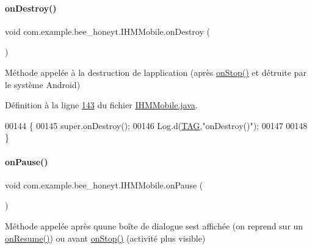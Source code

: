 \paragraph{\texorpdfstring{on\+Destroy()}{onDestroy()}}
{\footnotesize\ttfamily void com.\+example.\+bee\+\_\+honeyt.\+I\+H\+M\+Mobile.\+on\+Destroy (\begin{DoxyParamCaption}{ }\end{DoxyParamCaption})\hspace{0.3cm}{\ttfamily [protected]}}



Méthode appelée à la destruction de l\textquotesingle{}application (après \hyperlink{classcom_1_1example_1_1bee__honeyt_1_1_i_h_m_mobile_ad341d4dd8d326f2ecdca7a5447c3f8a4}{on\+Stop()} et détruite par le système Android) 



Définition à la ligne \hyperlink{_i_h_m_mobile_8java_source_l00143}{143} du fichier \hyperlink{_i_h_m_mobile_8java_source}{I\+H\+M\+Mobile.\+java}.


\begin{DoxyCode}
00144     \{
00145         super.onDestroy();
00146         Log.d(\hyperlink{classcom_1_1example_1_1bee__honeyt_1_1_i_h_m_mobile_a366987bf9bb2ed1010b2f967d4efa263}{TAG},\textcolor{stringliteral}{"onDestroy()"});
00147 
00148     \}
\end{DoxyCode}
\mbox{\label{classcom_1_1example_1_1bee__honeyt_1_1_i_h_m_mobile_a8b2f247beaf4e5f146c579b38d8bdee9}} 
\paragraph{\texorpdfstring{on\+Pause()}{onPause()}}
{\footnotesize\ttfamily void com.\+example.\+bee\+\_\+honeyt.\+I\+H\+M\+Mobile.\+on\+Pause (\begin{DoxyParamCaption}{ }\end{DoxyParamCaption})\hspace{0.3cm}{\ttfamily [protected]}}



Méthode appelée après qu\textquotesingle{}une boîte de dialogue s\textquotesingle{}est affichée (on reprend sur un \hyperlink{classcom_1_1example_1_1bee__honeyt_1_1_i_h_m_mobile_aa8e9489786f095aee58ae5895b118ef6}{on\+Resume()}) ou avant \hyperlink{classcom_1_1example_1_1bee__honeyt_1_1_i_h_m_mobile_ad341d4dd8d326f2ecdca7a5447c3f8a4}{on\+Stop()} (activité plus visible) 



